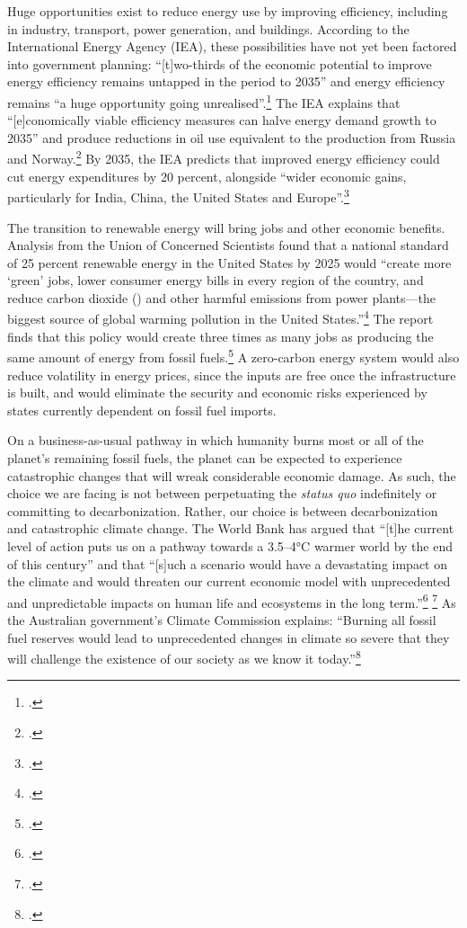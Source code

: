 Huge opportunities exist to reduce energy use by improving efficiency, including in industry, transport, power generation, and buildings.
According to the International Energy Agency (IEA), these possibilities have not yet been factored into government planning: ``[t]wo-thirds of the economic potential to improve energy efficiency remains untapped in the period to 2035'' and energy efficiency remains ``a huge opportunity going unrealised''.\footcite[][p. 13]{IEA2012press}
The IEA explains that ``[e]conomically viable efficiency measures can halve energy demand growth to 2035'' and produce reductions in oil use equivalent to the production from Russia and Norway.\footcite[][p. 14]{IEA2012press}
By 2035, the IEA predicts that improved energy efficiency could cut energy expenditures by 20 percent, alongside ``wider economic gains, particularly for India, China, the United States and Europe''.\footcite[][p. 15]{IEA2012press}



The transition to renewable energy will bring jobs and other economic benefits.
Analysis from the Union of Concerned Scientists found that a national standard of 25 percent renewable energy in the United States by 2025 would ``create more `green' jobs, lower consumer energy bills in every region of the country, and reduce carbon dioxide () and other harmful emissions from power plants—the biggest source of global warming pollution in the United States.''\footcite[][]{ConcernedScientistsJobs}
The report finds that this policy would create three times as many jobs as producing the same amount of energy from fossil fuels.\footcite[See also: ][]{CSBenefitsRenewable}
A zero-carbon energy system would also reduce volatility in energy prices, since the inputs are free once the infrastructure is built, and would eliminate the security and economic risks experienced by states currently dependent on fossil fuel imports.



On a business-as-usual pathway in which humanity burns most or all of the planet's remaining fossil fuels, the planet can be expected to experience catastrophic changes that will wreak considerable economic damage.
As such, the choice we are facing is not between perpetuating the \emph{status quo} indefinitely or committing to decarbonization.
Rather, our choice is between decarbonization and catastrophic climate change.
The World Bank has argued that ``[t]he current level of action puts us on a pathway towards a 3.5–4°C warmer world by the end of this century'' and that ``[s]uch a scenario would have a devastating impact on the climate and would threaten our current economic model with unprecedented and unpredictable impacts on human life and ecosystems in the long term.''\footcite[][p. 13]{WorldBankCarbonPricing} \footcite[See also:][]{WoesReverse}
As the Australian government's Climate Commission explains: ``Burning all fossil fuel reserves would lead to unprecedented changes in climate so severe that they will challenge the existence of our society as we know it today.''\footcite[][p. 5]{CriticalDecade2013}


